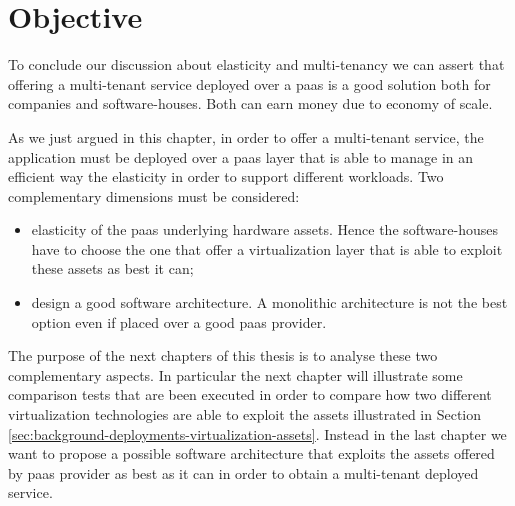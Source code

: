 %
%
\section{Objective}
\label{sec:elasticity-objective}
To conclude our discussion about elasticity and multi-tenancy we can assert that offering a multi-tenant
service deployed over a \ac{paas} is a good solution both for companies and software-houses. Both can
earn money due to economy of scale.

As we just argued in this chapter, in order to offer a multi-tenant service, the application must be
deployed over a \ac{paas} layer that is able to manage in an efficient way the elasticity in order to
support different workloads. Two complementary dimensions must be considered:

\begin{itemize}
	\item{elasticity of the \ac{paas} underlying hardware assets. Hence the software-houses have to
		choose the one that offer a virtualization layer that is able to exploit these assets as best it
		can;}
	\item{design a good software architecture. A monolithic architecture is not the best option even if
		placed over a good \ac{paas} provider.}
\end{itemize}

The purpose of the next chapters of this thesis is to analyse these two complementary aspects. In particular
the next chapter will illustrate some comparison tests that are been executed in order to compare how two
different virtualization technologies are able to exploit the assets illustrated in Section
\ref{sec:background-deployments-virtualization-assets}. Instead in the last chapter we want to propose a possible
software architecture that exploits the assets offered by \ac{paas} provider as best as it can
in order to obtain a multi-tenant deployed service.